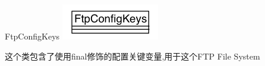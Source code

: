 \begin{XeClass}{FtpConfigKeys}
\includegraphics[width=\textwidth]{cdig/FtpConfigKeys.png}
     
 这个类包含了使用final修饰的配置关键变量,用于这个FTP File System

\end{XeClass}

